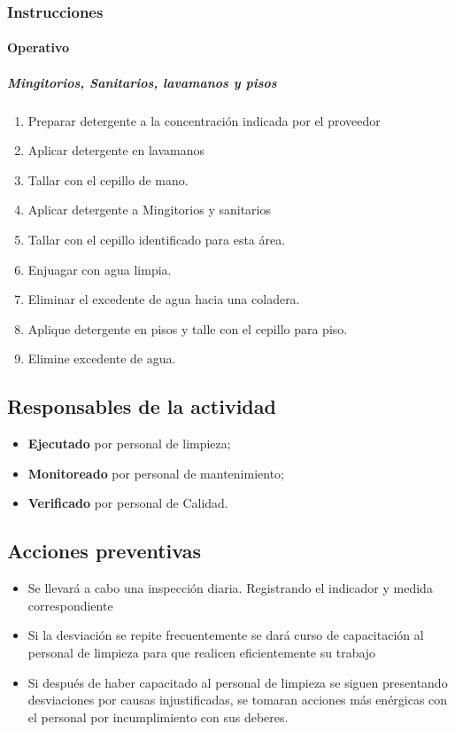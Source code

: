 \subsubsection{Instrucciones}
\paragraph{Operativo}
\subparagraph{Mingitorios, Sanitarios, lavamanos y pisos}
\begin{enumerate}
	\item Preparar detergente a la concentración indicada por el proveedor
	\item Aplicar detergente en lavamanos
	\item Tallar con el cepillo de mano.
	\item Aplicar detergente a Mingitorios y sanitarios
	\item Tallar con el cepillo identificado para esta área.
	\item Enjuagar con agua limpia.
	\item Eliminar el excedente de agua hacia una coladera.
	\item Aplique detergente en pisos y talle con el cepillo para piso.
	\item Elimine excedente de agua.
\end{enumerate}

\subsection{Responsables de la actividad}

\begin{itemize}
	\item \textbf{Ejecutado} por personal de limpieza;
	\item \textbf{Monitoreado} por personal de mantenimiento;
	\item \textbf{Verificado} por personal de Calidad.
\end{itemize}

\subsection{Acciones preventivas}

\begin{itemize}
	\item Se llevará a cabo una inspección diaria. Registrando el indicador y medida correspondiente
	\item Si la desviación se repite frecuentemente se dará curso de capacitación al personal de limpieza para que realicen eficientemente su trabajo
	\item Si después de haber capacitado al personal de limpieza se siguen presentando desviaciones por causas injustificadas, se tomaran acciones más enérgicas con el personal por incumplimiento con sus deberes.
\end{itemize}

